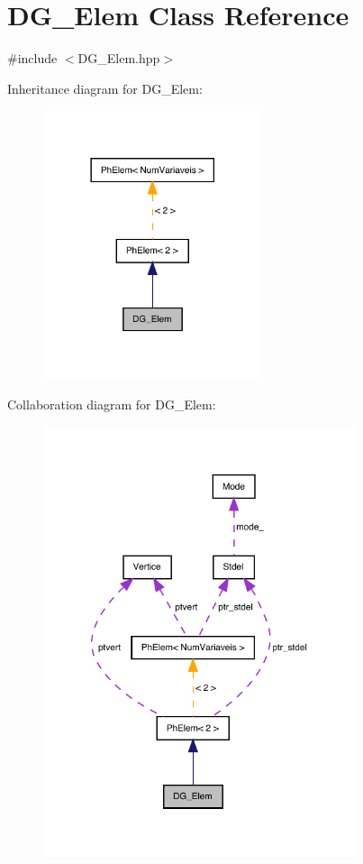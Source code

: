 \hypertarget{classDG__Elem}{}\section{D\+G\+\_\+\+Elem Class Reference}
\label{classDG__Elem}


{\ttfamily \#include $<$D\+G\+\_\+\+Elem.\+hpp$>$}



Inheritance diagram for D\+G\+\_\+\+Elem\+:
\nopagebreak
\begin{figure}[H]
\begin{center}
\leavevmode
\includegraphics[width=182pt]{classDG__Elem__inherit__graph}
\end{center}
\end{figure}


Collaboration diagram for D\+G\+\_\+\+Elem\+:
\nopagebreak
\begin{figure}[H]
\begin{center}
\leavevmode
\includegraphics[width=260pt]{classDG__Elem__coll__graph}
\end{center}
\end{figure}
